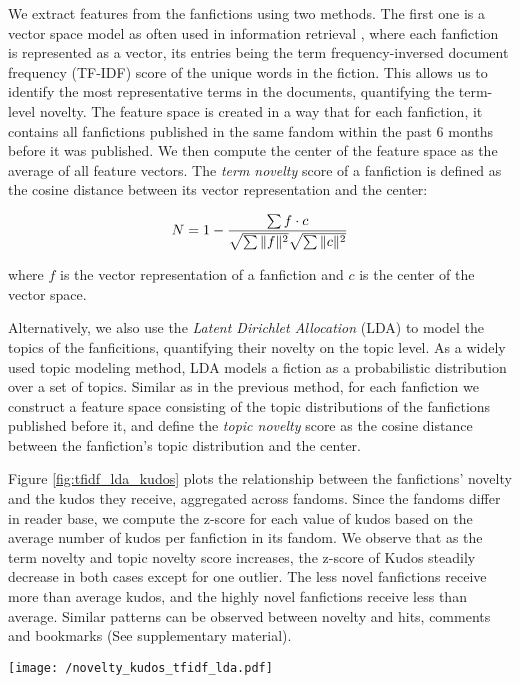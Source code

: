 \documentclass[letterpaper]{article} %
\DeclarePairedDelimiter{\norm}{\lVert}{\rVert}
\begin{document}
We extract features from the fanfictions using two methods. The first one is a vector space model as often used in information retrieval \cite{turney2010frequency}, where each fanfiction is represented as a vector, its entries being the term frequency-inversed document frequency (TF-IDF) score of the unique words in the fiction. This allows us to identify the most representative terms in the documents, quantifying the term-level novelty. The feature space is created in a way that for each fanfiction, it contains all fanfictions published in the same fandom within the past 6 months before it was published. We then compute the center of the feature space as the average of all feature vectors. The \emph{term novelty} score of a fanfiction is defined as the cosine distance between its vector representation and the center:

\begin{equation}
N = 1-\frac{\sum {f\cdot{c}}}{\sqrt{\sum{\norm{f}^2}}\sqrt{\sum{\norm{c}^2}}}
\end{equation}

where $f$ is the vector representation of a fanfiction and $c$ is the center of the vector space.

Alternatively, we also use the \emph{Latent Dirichlet Allocation} (LDA) \cite{blei2003latent} to model the topics of the fanficitions, quantifying their novelty on the topic level. As a widely used topic modeling method, LDA models a fiction as a probabilistic distribution over a set of topics. Similar as in the previous method, for each fanfiction we construct a feature space consisting of the topic distributions of the fanfictions published before it, and define the \emph{topic novelty} score as the cosine distance between the fanfiction's topic distribution and the center. 

Figure \ref{fig:tfidf_lda_kudos} plots the relationship between the fanfictions' novelty and the kudos they receive, aggregated across fandoms. Since the fandoms differ in reader base, we compute the z-score for each value of kudos based on the average number of kudos per fanfiction in its fandom. We observe that as the term novelty and topic novelty score increases, the z-score of Kudos steadily decrease in both cases except for one outlier. The less novel fanfictions receive more than average kudos, and the highly novel fanfictions receive less than average. Similar patterns can be observed between novelty and hits, comments and bookmarks (See supplementary material).

\begin{figure*}
    \centering
          \texttt{[image: /novelty\_kudos\_tfidf\_lda.pdf]}
        \caption{The relationship between novelty and kudos. Left: term novelty. Right: topic novelty. The horizontal axes are the novelty scores, and the vertical axes are the corresponding average of the z-score of kudos in bins with bin size = 0.1. The confidence intervals obtained from bootstrap resampling are shown. }
        \label{fig:tfidf_lda_kudos}
\end{figure*}
\end{document}
